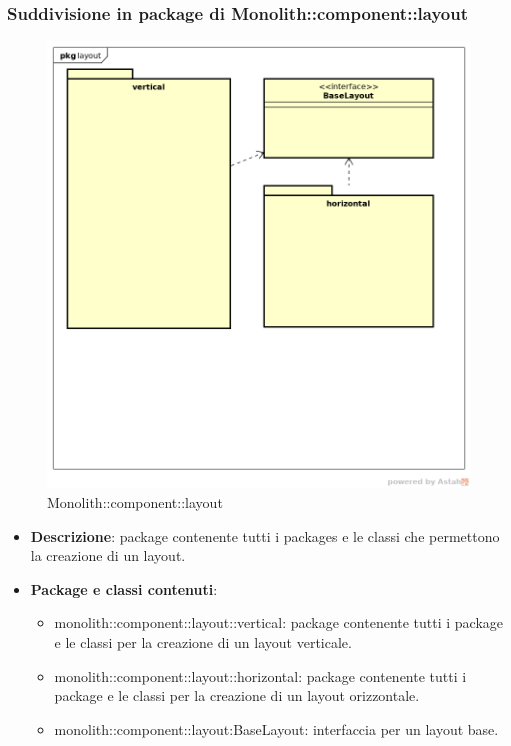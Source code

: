 \subsubsection{Suddivisione in package  di Monolith::component::layout}
\label{Monolith::component::layout}
\begin{figure}[H]
	\centering
	\includegraphics[scale=0.5]{Sezioni/imgPackage/component_layout.png}
	\caption{Monolith::component::layout}
\end{figure}
\begin{itemize}
	\item{\textbf{Descrizione}}: package contenente tutti i packages e le classi che permettono la creazione di un layout.
	\item{\textbf{Package e classi contenuti}}:
	\begin{itemize}
	\item{monolith::component::layout::vertical}: package contenente tutti i package e le classi per la creazione di un layout verticale.
	\item{monolith::component::layout::horizontal}: package contenente tutti i package e le classi per la creazione di un layout orizzontale.
	\item{monolith::component::layout:BaseLayout}: interfaccia per un layout base.
	\end{itemize}

\end{itemize}



